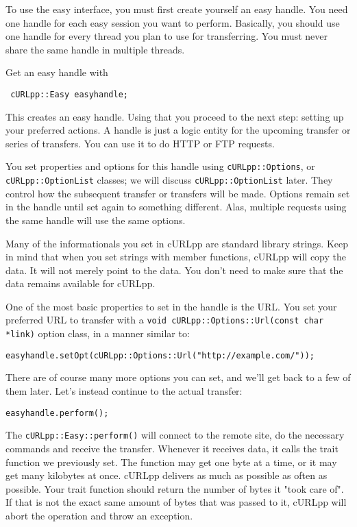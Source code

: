 \documentclass{article}
\begin{document}
To use the easy interface, you must first create yourself an easy handle. You
need one handle for each easy session you want to perform. Basically, you
should use one handle for every thread you plan to use for transferring. You
must never share the same handle in multiple threads.

Get an easy handle with

\begin{verbatim} cURLpp::Easy easyhandle;\end{verbatim}

This creates an easy handle. Using that you proceed to the next step: setting
up your preferred actions. A handle is just a logic entity for the upcoming
transfer or series of transfers. You can use it to do HTTP or FTP 
requests.

You set properties and options for this handle using \verb+cURLpp::Options+, 
or \verb+cURLpp::OptionList+ classes; we will discuss \verb+cURLpp::OptionList+
later. They control how the subsequent transfer or transfers will be made. 
Options remain set in the handle until set again to something different. 
Alas, multiple requests using the same handle will use the same options.

Many of the informationals you set in cURLpp are \Cpp standard library strings. 
Keep in mind that when you set strings with member functions, cURLpp will copy 
the data. It will not merely point to the data. You don't need to make sure 
that the data remains available for cURLpp.

One of the most basic properties to set in the handle is the URL. You set
your preferred URL to transfer with a 
\verb+void cURLpp::Options::Url(const char *link)+
option class, in a manner similar to:

\begin{verbatim} 
easyhandle.setOpt(cURLpp::Options::Url("http://example.com/"));
\end{verbatim}

There are of course many more options you can set, and we'll get back to a
few of them later. Let's instead continue to the actual transfer:

\begin{verbatim}
easyhandle.perform();
\end{verbatim}

The \verb+cURLpp::Easy::perform()+ will connect to the remote site, do the necessary
commands and receive the transfer. Whenever it receives data, it calls the
trait function we previously set. The function may get one byte at a time,
or it may get many kilobytes at once. cURLpp delivers as much as possible as
often as possible. Your trait function should return the number of bytes
it "took care of". If that is not the exact same amount of bytes that was
passed to it, cURLpp will abort the operation and throw an exception.
\end{document}
